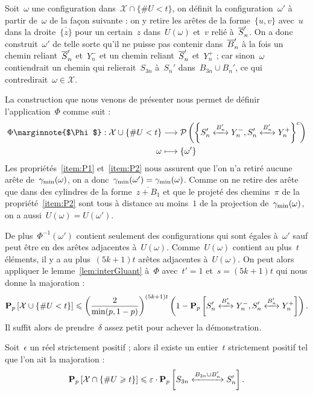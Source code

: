 			\begin{dem}
				Soit~$\omega$ une configuration dans~$\mathcal{X} \cap \{\# U < t\}$, on définit la configuration~$\omega'$ à partir de~$\omega$ de la façon suivante : on y retire les arêtes de la forme~$\{u,v\}$ avec~$u$ dans la droite~$\overline{\{z\}}$ pour un certain~$z$ dans~$U(\omega)$ et~$v$ relié à~$\SnB[n]'$.
				On a donc construit~$\omega'$ de telle sorte qu'il ne puisse pas contenir dans~$\BnB '$ à la fois un chemin reliant~$\SnB[n]'$ et~$Y_n^-$ et un chemin reliant~$\SnB[n]'$ et~$Y_n^+$ ; car sinon~$\omega$ contiendrait un chemin qui relierait~$S_{3n}$ à~$S_n'$ dans~$B_{3n}\cup B_n'$, ce qui contredirait~$\omega\in\mathcal{X}$.
			
				La construction que nous venons de présenter nous permet de définir l'application~$\Phi$ comme suit :
				\begin{align*}
					\Phi \marginnote{$\Phi$} : \mathcal{X}\cup\{\# U < t\} 	& \longrightarrow 	
											\mathcal{P}\left(
												\left\{\relie[B_n']{S_n'}{Y_n^-},
												\relie[B_n']{S_n'}{Y_n^+}\right\}^c
											\right)\\
						\omega				& \longmapsto 		\{\omega'\}
				\end{align*}	
				Les propriétés~\ref{item:P1} et~\ref{item:P2} nous assurent que l'on n'a retiré aucune arête de~$\Cmin$, on a donc~$\Cmin[\omega'] = \Cmin$. Comme on ne retire des arête que dans des cylindres de la forme~$\overline{z+B_1}$ et que le projeté des chemins~$\pi$ de la propriété~\ref{item:P2} sont tous à distance au moins~$1$ de la projection de~$\Cmin$, on a aussi~$U(\omega) = U(\omega')$.

				De plus~$\Phi^{-1}(\omega')$ contient seulement des configurations qui sont égales à~$\omega'$ sauf peut être en des arêtes adjacentes à~$U(\omega)$. Comme~$U(\omega)$ contient au plus~$t$ éléments, il y a au plus~$(5k+1)t$ arêtes adjacentes à~$U(\omega)$. On peut alors appliquer le lemme~\ref{lem:interGluant} à~$\Phi$ avec~$t'=1$ et~$s=(5k+1)t$ qui nous donne la majoration :
				\[
						\Pp{\mathcal{X}\cup\{\#U < t\}}
					\leq
						\left(
							\frac{2}{\min(p,1-p)}
						\right)^{(5k+1)t}
						\left( 1 - \Pp{\relie[B_n']{S_n'}{Y_n^-}, \relie[B_n']{S_n'}{Y_n^+}}\right).
				\]
				Il suffit alors de prendre~$\delta$ assez petit pour achever la démonstration.
			\end{dem}
			\begin{prop}\label{prop:Ugrand}
				Soit~$\epsilon$ un réel strictement positif ; alors il existe un entier~$t$ strictement positif tel que l'on ait la majoration :
				\[
						\Pp{\mathcal{X}\cap\{\# U \geq t\}} 
					\leq 
						\epsilon
						\cdot
						\Pp{\relie[B_{3n}\cup B_n']{S_{3n}}{S_n'}}.
				\]
			\end{prop}

